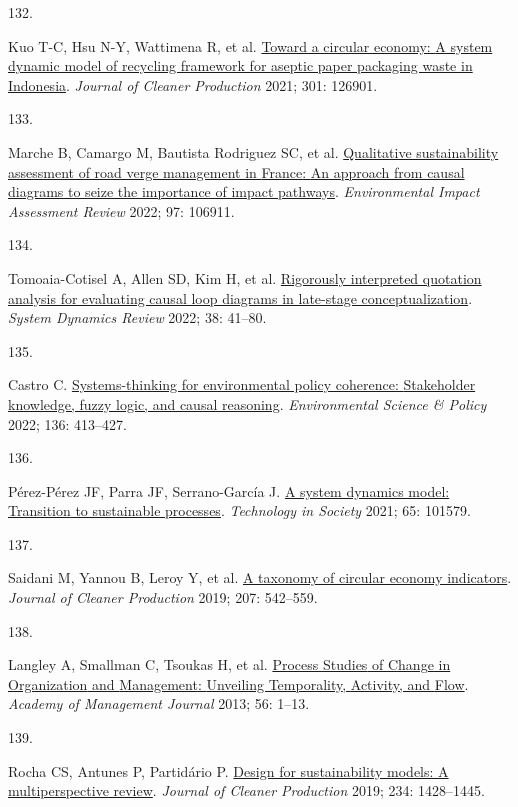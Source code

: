 \documentclass[
  12pt,
  a4paperpaper,
  onecolumn]{article}
\newlength{\cslhangindent}
\newlength{\csllabelwidth}
\newlength{\cslentryspacingunit} %
\newenvironment{CSLReferences}[2] %
 {%
  \setlength{\parindent}{0pt}
  \ifodd #1
  \let\oldpar\par
  \def\par{\hangindent=\cslhangindent\oldpar}
  \fi
  \setlength{\parskip}{#2\cslentryspacingunit}
 }%
 {}
\newcommand{\CSLLeftMargin}[1]{\parbox[t]{\csllabelwidth}{#1}}
\newcommand{\CSLRightInline}[1]{\parbox[t]{\linewidth - \csllabelwidth}{#1}\break}
\begin{document}
\begin{CSLReferences}{0}{0}
\leavevmode{}%
\CSLLeftMargin{132. }%
\CSLRightInline{Kuo T-C, Hsu N-Y, Wattimena R, et al.
\href{https://doi.org/10.1016/j.jclepro.2021.126901}{Toward a circular
economy: {A} system dynamic model of recycling framework for aseptic
paper packaging waste in {Indonesia}}. \emph{Journal of Cleaner
Production} 2021; 301: 126901.}

\leavevmode{}%
\CSLLeftMargin{133. }%
\CSLRightInline{Marche B, Camargo M, Bautista Rodriguez SC, et al.
\href{https://doi.org/10.1016/j.eiar.2022.106911}{Qualitative
sustainability assessment of road verge management in {France}: {An}
approach from causal diagrams to seize the importance of impact
pathways}. \emph{Environmental Impact Assessment Review} 2022; 97:
106911.}

\leavevmode{}%
\CSLLeftMargin{134. }%
\CSLRightInline{Tomoaia-Cotisel A, Allen SD, Kim H, et al.
\href{https://doi.org/10.1002/SDR.1701}{Rigorously interpreted quotation
analysis for evaluating causal loop diagrams in late-stage
conceptualization}. \emph{System Dynamics Review} 2022; 38: 41--80.}

\leavevmode{}%
\CSLLeftMargin{135. }%
\CSLRightInline{Castro C.
\href{https://doi.org/10.1016/j.envsci.2022.07.001}{Systems-thinking for
environmental policy coherence: {Stakeholder} knowledge, fuzzy logic,
and causal reasoning}. \emph{Environmental Science \& Policy} 2022; 136:
413--427.}

\leavevmode{}%
\CSLLeftMargin{136. }%
\CSLRightInline{Pérez-Pérez JF, Parra JF, Serrano-García J.
\href{https://doi.org/10.1016/j.techsoc.2021.101579}{A system dynamics
model: {Transition} to sustainable processes}. \emph{Technology in
Society} 2021; 65: 101579.}

\leavevmode{}%
\CSLLeftMargin{137. }%
\CSLRightInline{Saidani M, Yannou B, Leroy Y, et al.
\href{https://doi.org/10.1016/j.jclepro.2018.10.014}{A taxonomy of
circular economy indicators}. \emph{Journal of Cleaner Production} 2019;
207: 542--559.}

\leavevmode{}%
\CSLLeftMargin{138. }%
\CSLRightInline{Langley A, Smallman C, Tsoukas H, et al.
\href{https://doi.org/10.5465/amj.2013.4001}{Process {Studies} of
{Change} in {Organization} and {Management}: {Unveiling Temporality},
{Activity}, and {Flow}}. \emph{Academy of Management Journal} 2013; 56:
1--13.}

\leavevmode{}%
\CSLLeftMargin{139. }%
\CSLRightInline{Rocha CS, Antunes P, Partidário P.
\href{https://doi.org/10.1016/j.jclepro.2019.06.108}{Design for
sustainability models: {A} multiperspective review}. \emph{Journal of
Cleaner Production} 2019; 234: 1428--1445.}

\end{CSLReferences}
\end{document}
